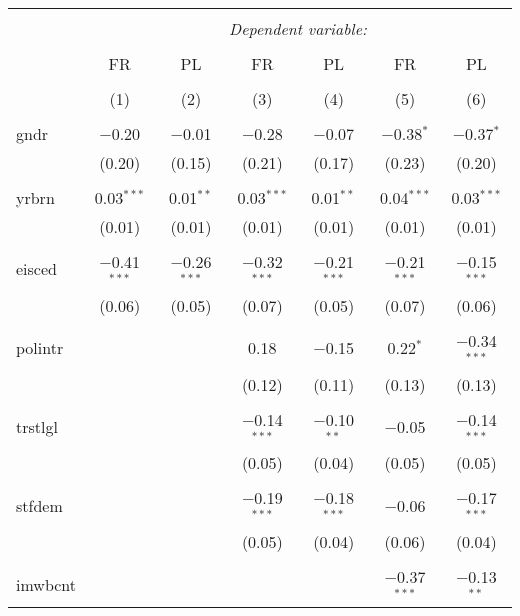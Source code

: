 
\begin{table}[!htbp] \centering 
  \caption{} 
  \label{} 
\begin{tabular}{@{\extracolsep{5pt}}lcccccc} 
\\[-1.8ex]\hline 
\hline \\[-1.8ex] 
 & \multicolumn{6}{c}{\textit{Dependent variable:}} \\ 
\cline{2-7} 
\\[-1.8ex] & FR & PL & FR & PL & FR & PL \\ 
\\[-1.8ex] & (1) & (2) & (3) & (4) & (5) & (6)\\ 
\hline \\[-1.8ex] 
 gndr & $-$0.20 & $-$0.01 & $-$0.28 & $-$0.07 & $-$0.38$^{*}$ & $-$0.37$^{*}$ \\ 
  & (0.20) & (0.15) & (0.21) & (0.17) & (0.23) & (0.20) \\ 
  & & & & & & \\ 
 yrbrn & 0.03$^{***}$ & 0.01$^{**}$ & 0.03$^{***}$ & 0.01$^{**}$ & 0.04$^{***}$ & 0.03$^{***}$ \\ 
  & (0.01) & (0.01) & (0.01) & (0.01) & (0.01) & (0.01) \\ 
  & & & & & & \\ 
 eisced & $-$0.41$^{***}$ & $-$0.26$^{***}$ & $-$0.32$^{***}$ & $-$0.21$^{***}$ & $-$0.21$^{***}$ & $-$0.15$^{***}$ \\ 
  & (0.06) & (0.05) & (0.07) & (0.05) & (0.07) & (0.06) \\ 
  & & & & & & \\ 
 polintr &  &  & 0.18 & $-$0.15 & 0.22$^{*}$ & $-$0.34$^{***}$ \\ 
  &  &  & (0.12) & (0.11) & (0.13) & (0.13) \\ 
  & & & & & & \\ 
 trstlgl &  &  & $-$0.14$^{***}$ & $-$0.10$^{**}$ & $-$0.05 & $-$0.14$^{***}$ \\ 
  &  &  & (0.05) & (0.04) & (0.05) & (0.05) \\ 
  & & & & & & \\ 
 stfdem &  &  & $-$0.19$^{***}$ & $-$0.18$^{***}$ & $-$0.06 & $-$0.17$^{***}$ \\ 
  &  &  & (0.05) & (0.04) & (0.06) & (0.04) \\ 
  & & & & & & \\ 
 imwbcnt &  &  &  &  & $-$0.37$^{***}$ & $-$0.13$^{**}$ \\ 

\end{tabular}
\end{table}
